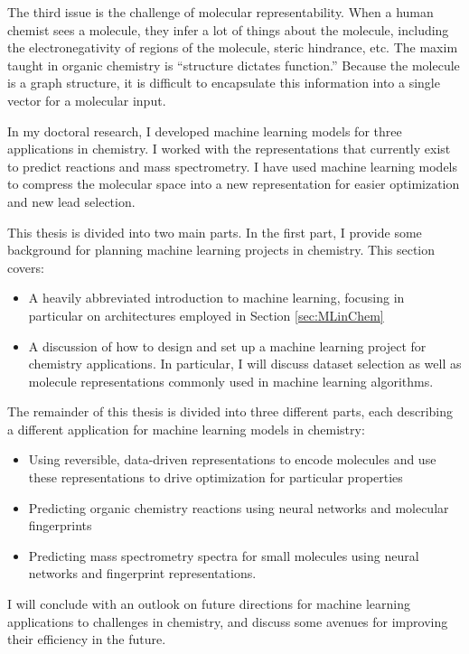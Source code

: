 The third issue is the challenge of molecular representability. When a human chemist sees a molecule, they infer a lot of things about the molecule, including the electronegativity of regions of the molecule, steric hindrance, etc. The maxim taught in organic chemistry is “structure dictates function.” Because the molecule is a graph structure, it is difficult to encapsulate this information into a single vector for a molecular input.

In my doctoral research, I developed machine learning models for three applications in chemistry. I worked with the representations that currently exist to predict reactions and mass spectrometry. I have used machine learning models to compress the molecular space into a new representation for easier optimization and new lead selection.

This thesis is divided into two main parts. In the first part, I provide some background for planning machine learning projects in chemistry. This section covers:
\begin{itemize}
\item A heavily abbreviated introduction to machine learning, focusing in particular on architectures employed in Section \ref{sec:MLinChem} 
\item A discussion of how to design and set up a machine learning project for chemistry applications. In particular, I will discuss dataset selection as well as molecule representations commonly used in machine learning algorithms. 
\end{itemize}

The remainder of this thesis is divided into three different parts, each describing a different application for machine learning models in chemistry: 
\begin{itemize}
\item Using reversible, data-driven representations to encode molecules and use these representations to drive optimization for particular properties
\item Predicting organic chemistry reactions using neural networks and molecular fingerprints
\item Predicting mass spectrometry spectra for small molecules using neural networks and fingerprint representations.
\end{itemize}

I will conclude with an outlook on future directions for machine learning applications to challenges in chemistry, and discuss some avenues for improving their efficiency in the future. 

